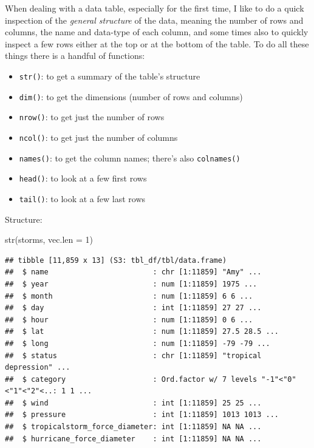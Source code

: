 \documentclass[
]{book}
\newenvironment{Shaded}{\begin{snugshade}}{\end{snugshade}}
\newcommand{\AttributeTok}[1]{\textcolor[rgb]{0.77,0.63,0.00}{#1}}
\newcommand{\DecValTok}[1]{\textcolor[rgb]{0.00,0.00,0.81}{#1}}
\newcommand{\FunctionTok}[1]{\textcolor[rgb]{0.00,0.00,0.00}{#1}}
\newcommand{\NormalTok}[1]{#1}
\begin{document}
When dealing with a data table, especially for the first time, I like to do
a quick inspection of the \emph{general structure} of the data, meaning the number
of rows and columns, the name and data-type of each column, and some times
also to quickly inspect a few rows either at the top or at the bottom of the
table. To do all these things there is a handful of functions:

\begin{itemize}
\item
  \texttt{str()}: to get a summary of the table's structure
\item
  \texttt{dim()}: to get the dimensions (number of rows and columns)
\item
  \texttt{nrow()}: to get just the number of rows
\item
  \texttt{ncol()}: to get just the number of columns
\item
  \texttt{names()}: to get the column names; there's also \texttt{colnames()}
\item
  \texttt{head()}: to look at a few first rows
\item
  \texttt{tail()}: to look at a few last rows
\end{itemize}

Structure:

\begin{Shaded}
\begin{Highlighting}[]
\FunctionTok{str}\NormalTok{(storms, }\AttributeTok{vec.len =} \DecValTok{1}\NormalTok{)}
\end{Highlighting}
\end{Shaded}

\begin{verbatim}
## tibble [11,859 x 13] (S3: tbl_df/tbl/data.frame)
##  $ name                        : chr [1:11859] "Amy" ...
##  $ year                        : num [1:11859] 1975 ...
##  $ month                       : num [1:11859] 6 6 ...
##  $ day                         : int [1:11859] 27 27 ...
##  $ hour                        : num [1:11859] 0 6 ...
##  $ lat                         : num [1:11859] 27.5 28.5 ...
##  $ long                        : num [1:11859] -79 -79 ...
##  $ status                      : chr [1:11859] "tropical depression" ...
##  $ category                    : Ord.factor w/ 7 levels "-1"<"0"<"1"<"2"<..: 1 1 ...
##  $ wind                        : int [1:11859] 25 25 ...
##  $ pressure                    : int [1:11859] 1013 1013 ...
##  $ tropicalstorm_force_diameter: int [1:11859] NA NA ...
##  $ hurricane_force_diameter    : int [1:11859] NA NA ...
\end{verbatim}
\end{document}
